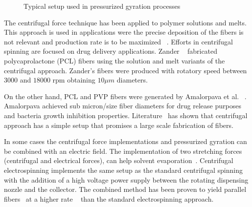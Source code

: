 \bgroup
\begin{figure}[!htbp]
\centering \makeatletter{}
\makeatother 
\caption{{Typical setup used in pressurized gyration processes}}
\label{f-7cf6ac702e28}
\end{figure}
\egroup
The centrifugal force technique has been applied to polymer solutions and melts. This approach is used in applications were the precise deposition of the fibers is not relevant and production rate is to be maximized \unskip~\cite{527120:13535894}.  Efforts in centrifugal spinning are focused on drug delivery applications. Zander \unskip~\cite{527120:13535977} fabricated polycaprolactone (PCL) fibers using the solution and melt variants of the centrifugal approach. Zander's fibers were produced with rotatory speed between $3000$ and $18000 \textrm{ rpm}$ obtaining $10 \mu m $ diameters. 

On the other hand, PCL and PVP fibers were generated by Amalorpava et al. \unskip~\cite{527120:13536089}.  Amalorpava achieved sub micron/size fiber diameters for drug release purposes and bacteria growth inhibition properties. Literature\unskip~\cite{527120:13536446} has shown that centrifugal approach has a simple setup that promises a large scale fabrication of fibers.

In some cases the centrifugal force implementations and pressurized gyration can be combined with an electric field. The implementation of two stretching forces (centrifugal and electrical forces), can help solvent evaporation\unskip~\cite{527120:13536560}. Centrifugal electrospinning implements the same setup as the standard centrifugal spinning with the addition of a high voltage power supply between the rotating dispensing nozzle and the collector. The combined method has been proven to yield parallel fibers\unskip~\cite{527120:13536841,527120:13536900,527120:13537392,527120:13537393} at a higher rate \unskip~\cite{527120:13536841,527120:13536900} than the standard electrospinning approach.



